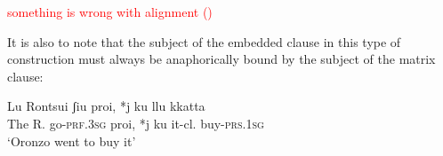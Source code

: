 \documentclass[output=paper]{langscibook}
\newcounter{lasttmp}    %
\newcommand{\Last}{\setcounter{lasttmp}{\value{equation}}(\thelasttmp)\xspace}
\begin{document}
\ea\label{ac17}
    \z
\z

\textcolor{red}{something is wrong with alignment \Last}

It is also to note that the subject of the embedded clause in this type of construction must always be anaphorically bound by the subject of the matrix clause:

\ea \label{ac18}\gll Lu Rontsui   ʃiu        proi, *j  ku  llu    kkatta\\
  The R.     go-\textsc{prf}.\textsc{3sg}  proi, *j  ku  it-cl.  buy-\textsc{prs}.\textsc{1sg}  \\
  \glt ‘Oronzo went to buy it’
\z
\end{document}
